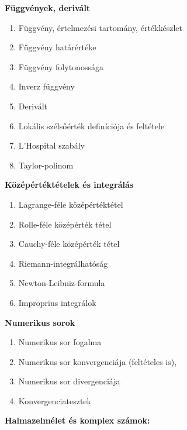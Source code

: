 \documentclass[11pt,a4paper]{article}
\begin{document}
\textbf{Függvények, derivált}
\begin{enumerate}
    \item Függvény, értelmezési tartomány, értékkészlet
    \item Függvény határértéke
    \item Függvény folytonossága
    \item Inverz függvény
    \item Derivált
    \item Lokális szélsőérték definíciója és feltétele
    \item L'Hospital szabály
    \item Taylor-polinom
\end{enumerate}
\textbf{Középértéktételek és integrálás}
\begin{enumerate}
    \item Lagrange-féle középértéktétel
    \item Rolle-féle középérték tétel
    \item Cauchy-féle középérték tétel
    \item Riemann-integrálhatóság
    \item Newton-Leibniz-formula
    \item Improprius integrálok
\end{enumerate}
\textbf{Numerikus sorok}
\begin{enumerate}
    \item Numerikus sor fogalma
    \item Numerikus sor konvergenciája (feltételes is),
    \item Numerikus sor divergenciája
    \item Konvergenciatesztek
\end{enumerate}


\newpage
\textbf{Halmazelmélet és komplex számok:}
\end{document}
